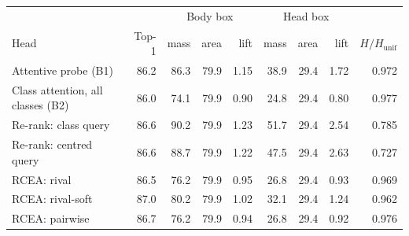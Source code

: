 \begin{tabular}{lrrrrrrrr}
\toprule
 & & \multicolumn{3}{c}{Body box} & \multicolumn{3}{c}{Head box} & \\
Head & Top-1 & mass & area & lift & mass & area & lift & $H/H_{\mathrm{unif}}$ \\
\midrule
Attentive probe (B1) & 86.2 & 86.3 & 79.9 & 1.15 & 38.9 & 29.4 & 1.72 & 0.972 \\
Class attention, all classes (B2) & 86.0 & 74.1 & 79.9 & 0.90 & 24.8 & 29.4 & 0.80 & 0.977 \\
Re-rank: class query & 86.6 & 90.2 & 79.9 & 1.23 & 51.7 & 29.4 & 2.54 & 0.785 \\
Re-rank: centred query & 86.6 & 88.7 & 79.9 & 1.22 & 47.5 & 29.4 & 2.63 & 0.727 \\
RCEA: rival & 86.5 & 76.2 & 79.9 & 0.95 & 26.8 & 29.4 & 0.93 & 0.969 \\
RCEA: rival-soft & 87.0 & 80.2 & 79.9 & 1.02 & 32.1 & 29.4 & 1.24 & 0.962 \\
RCEA: pairwise & 86.7 & 76.2 & 79.9 & 0.94 & 26.8 & 29.4 & 0.92 & 0.976 \\
\bottomrule
\end{tabular}

